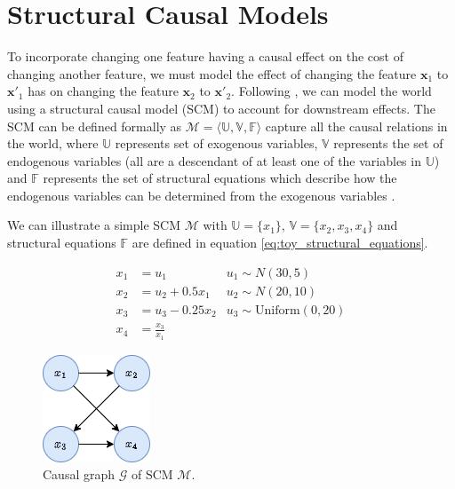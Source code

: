 \section{Structural Causal Models} \label{section:scms}

To incorporate changing one feature having a causal effect on the cost of changing another feature, we must model the effect of changing the feature $\mathbf{x}_1$ to $\mathbf{x'}_1$ has on changing the feature $\mathbf{x}_2$ to $\mathbf{x'}_2$. Following \textcite{karimiAlgorithmicRecourseCounterfactual2021}, we can model the world using a structural causal model (SCM) to account for downstream effects. The SCM can be defined formally as $\mathcal{M} = \langle\mathbb{U, V, F}\rangle$ capture all the causal relations in the world, where $\mathbb{U}$ represents set of exogenous variables, $\mathbb{V}$ represents the set of endogenous variables (all are a descendant of at least one of the variables in $\mathbb{U}$) and $\mathbb{F}$ represents the set of structural equations which describe how the endogenous variables can be determined from the exogenous variables \citep{pearl2016causal}.

We can illustrate a simple SCM $\mathcal{M}$ with $\mathbb{U} = \{x_1\}$, $\mathbb{V} = \{x_2, x_3, x_4\}$ and structural equations $\mathbb{F}$ are defined in equation \ref{eq:toy_structural_equations}.

\begin{align} \label{eq:toy_structural_equations}
	x_1 & = u_1 & u_1 \sim N(30 , 5) \\ \nonumber %
	x_2 & = u_2 + 0.5x_1 & u_2 \sim N(20, 10) \\ \nonumber %
	x_3 & = u_3 - 0.25x_2 & u_3 \sim \text{Uniform}(0, 20) \\ \nonumber %
	x_4 & = \frac{x_3}{x_1} %
\end{align}


\begin{figure}[!htb]
	\centering
	\includegraphics[width=0.25\linewidth]{images/draw.io/Simple SCM.png}
	\caption{Causal graph $\mathcal{G}$ of SCM $\mathcal{M}$.}
	\label{fig:toy_scm}
\end{figure}


